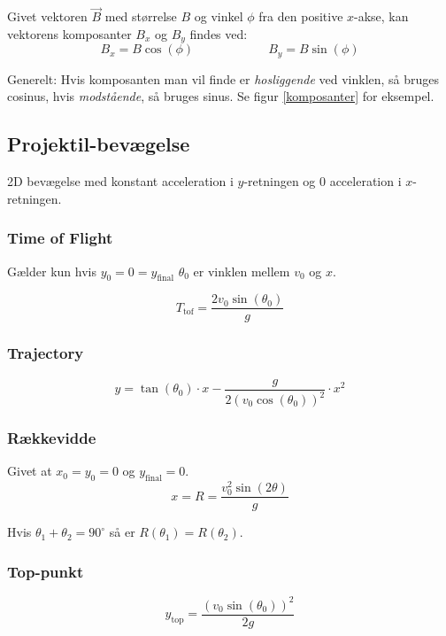 Givet vektoren $\vec B$ med størrelse $B$ og vinkel $\phi$ fra den positive $x$-akse, kan vektorens komposanter $B_x$ og $B_y$ findes ved:
\[
    B_x = B \cos(\phi) \hspace{6em}
    B_y = B \sin(\phi)
\]

Generelt: Hvis komposanten man vil finde er \emph{hosliggende} ved vinklen, så bruges cosinus, hvis \emph{modstående}, så bruges sinus.
Se figur \ref{komposanter} for eksempel.

\subsection{Projektil-bevægelse}
2D bevægelse med konstant acceleration i $y$-retningen og 0 acceleration i $x$-retningen.

\subsubsection{Time of Flight}
Gælder kun hvis $y_0 = 0 = y_{\text{final}}$ \hfill $\theta_0$ er vinklen mellem $v_0$ og $x$.

\[
    T_{\text{tof}} = \frac{2 v_0 \sin(\theta_0)}{g}
\]


\subsubsection{Trajectory}
\[
    y = \tan(\theta_0) \cdot x - \frac{g}{2(v_0 \cos(\theta_0))^2} \cdot x^2
\]


\subsubsection{Rækkevidde}
Givet at $x_0 = y_0 = 0$ og $y_{\text{final}} = 0$.
\[
    x = R = \frac{v_0^2 \sin(2\theta)}{g}
\]


Hvis $\theta_1 + \theta_2 = 90^\circ$ så er $R(\theta_1) = R(\theta_2)$.

\subsubsection{Top-punkt}

\[
    y_{\text{top}} = \frac{(v_0 \sin(\theta_0))^2}{2g}
\]


